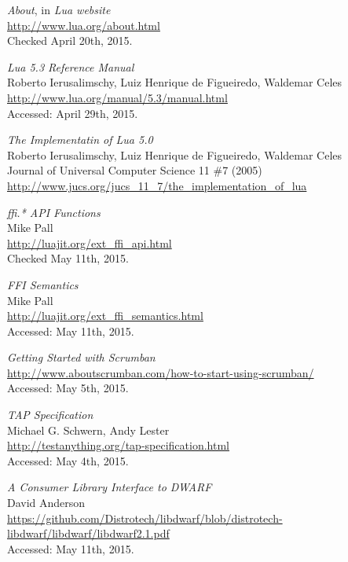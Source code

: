 \begin{thebibliography}{99}
		\emph{About}, in \emph{Lua website} \\
		\url{http://www.lua.org/about.html} \\
		Checked April 20th, 2015.

		\emph{Lua 5.3 Reference Manual} \\
		Roberto Ierusalimschy, Luiz Henrique de Figueiredo,
		Waldemar Celes \\
		\url{http://www.lua.org/manual/5.3/manual.html} \\
		Accessed: April 29th, 2015.

		\emph{The Implementatin of Lua 5.0} \\
		Roberto Ierusalimschy, Luiz Henrique de Figueiredo,
		Waldemar Celes \\
		Journal of Universal Computer Science 11 \#7 (2005) \\
		\url{http://www.jucs.org/jucs_11_7/the_implementation_of_lua}

		\emph{ffi.* API Functions} \\
		Mike Pall \\
		\url{http://luajit.org/ext_ffi_api.html} \\
		Checked May 11th, 2015.

		\emph{FFI Semantics} \\
		Mike Pall \\
		\url{http://luajit.org/ext_ffi_semantics.html} \\
		Accessed: May 11th, 2015.

		\emph{Getting Started with Scrumban} \\
		\url{http://www.aboutscrumban.com/how-to-start-using-scrumban/} \\
		Accessed: May 5th, 2015.

		\emph{TAP Specification} \\
		Michael G. Schwern, Andy Lester \\
		\url{http://testanything.org/tap-specification.html} \\
		Accessed: May 4th, 2015.

		\emph{A Consumer Library Interface to DWARF} \\
		David Anderson \\
		\url{https://github.com/Distrotech/libdwarf/blob/distrotech-libdwarf/libdwarf/libdwarf2.1.pdf} \\
		Accessed: May 11th, 2015.


\end{thebibliography}
